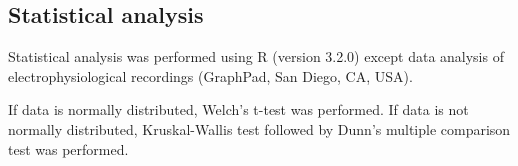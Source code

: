 \subsection*{Statistical analysis}

Statistical analysis was performed using R (version 3.2.0) except data analysis of electrophysiological recordings (GraphPad, San Diego, CA, USA).

If data is normally distributed, Welch's t-test was performed.
If data is not normally distributed, Kruskal-Wallis test followed by Dunn's multiple comparison test was performed.
    
  